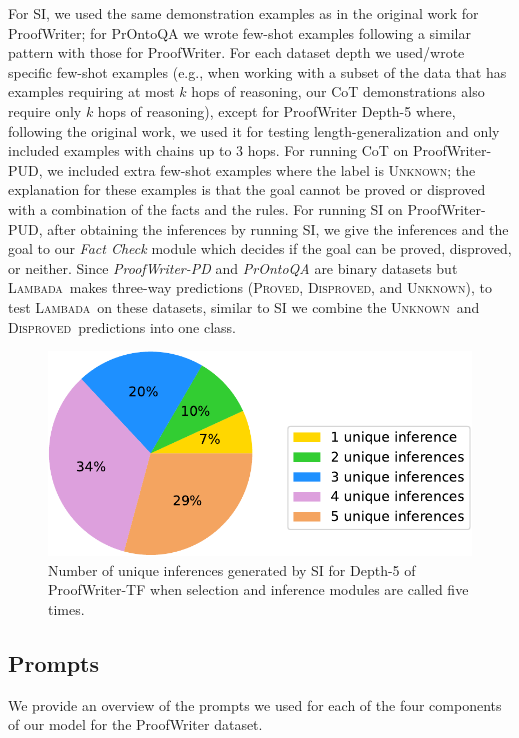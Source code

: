 \documentclass[11pt]{article}
\newcommand{\algo}{\textsc{Lambada}}
\newcommand{\proved}{\textsc{Proved}}
\newcommand{\disproved}{\textsc{Disproved}}
\newcommand{\unk}{\textsc{Unknown}}
\newcommand{\module}[1]{\emph{#1}}
\begin{document}
For SI, we used the same demonstration examples as in the original work for ProofWriter; for PrOntoQA we wrote few-shot examples following a similar pattern with those for ProofWriter. For each dataset depth we used/wrote specific few-shot examples (e.g., when working with a subset of the data that has examples requiring at most $k$ hops of reasoning, our CoT demonstrations also require only $k$ hops of reasoning), except for ProofWriter Depth-5 where, following the original work, we used it for testing length-generalization and only included examples with chains up to $3$ hops. For running CoT on ProofWriter-PUD, we included extra few-shot examples where the label is \unk; the explanation for these examples is that the goal cannot be proved or disproved with a combination of the facts and the rules. For running SI on ProofWriter-PUD, after obtaining the inferences by running SI, we give the inferences and the goal to our \module{Fact Check} module which decides if the goal can be proved, disproved, or neither. Since \emph{ProofWriter-PD} and \emph{PrOntoQA} are binary datasets but \algo\  makes three-way predictions (\proved, \disproved, and \unk), to test \algo\ on these datasets, similar to SI we combine the \unk\ and \disproved\ predictions into one class.


\begin{figure}[t]
  \centering
  \includegraphics[width=\columnwidth]{si-dup-cropped.pdf}
  \caption{%
  \label{fig:si-dup} %
    Number of unique inferences generated by SI for Depth-5 of ProofWriter-TF when selection and inference modules are called five times.
  }
\end{figure}

\subsection{Prompts}
\label{sec:prompts}
We provide an overview of the prompts we used for each of the four components of our model for the ProofWriter dataset.
\end{document}
